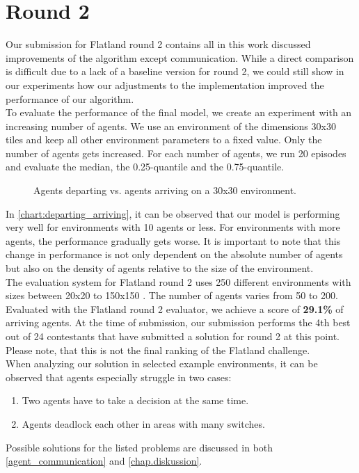 \section{Round 2}
Our submission for Flatland round 2 contains all in this work discussed improvements of the algorithm except communication. While a direct comparison is difficult due to a lack of a baseline version for round 2, we could still show in our experiments how our adjustments to the implementation improved the performance of our algorithm.\\
To evaluate the performance of the final model, we create an experiment with an increasing number of agents. We use an environment of the dimensions 30x30 tiles and keep all other environment parameters to a fixed value. Only the number of agents gets increased. For each number of agents, we run 20 episodes and evaluate the median, the 0.25-quantile and the 0.75-quantile.
\begin{figure}[H]
	\begin{center}
		
	\end{center}
	\caption{Agents departing vs. agents arriving on a 30x30 environment.}
	\label{chart:departing_arriving}
\end{figure}
In \autoref{chart:departing_arriving}, it can be observed that our model is performing very well for environments with 10 agents or less. For environments with more agents, the performance gradually gets worse. It is important to note that this change in performance is not only dependent on the absolute number of agents but also on the density of agents relative to the size of the environment.\\
The evaluation system for Flatland round 2 uses 250 different environments with sizes between 20x20 to 150x150 \cite{flatland_faq}. The number of agents varies from 50 to 200.
Evaluated with the Flatland round 2 evaluator, we achieve a score of \textbf{29.1\%} of arriving agents. At the time of submission, our submission performs the 4th best out of 24 contestants that have submitted a solution for round 2 at this point. Please note, that this is not the final ranking of the Flatland challenge.\\
When analyzing our solution in selected example environments, it can be observed that agents especially struggle in two cases:
\begin{enumerate}
	\item Two agents have to take a decision at the same time.
	\item Agents deadlock each other in areas with many switches.
\end{enumerate}
Possible solutions for the listed problems are discussed in both \autoref{agent_communication} and \autoref{chap.diskussion}.







